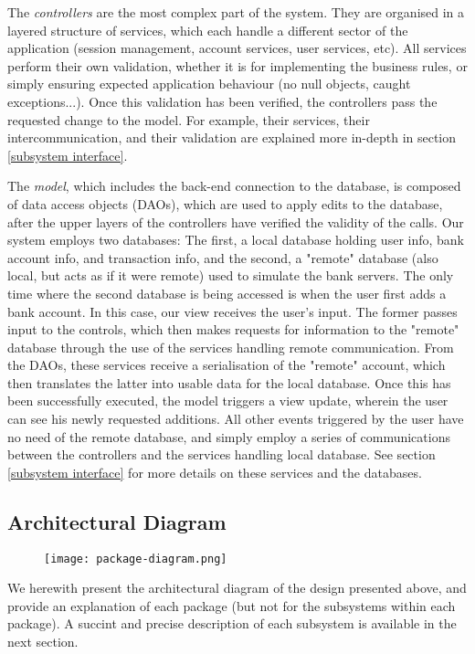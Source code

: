 \documentclass[12pt]{article}
\begin{document}
The \textit{controllers} are the most complex part of the system. They are organised in a layered structure of services, which each handle a different sector of the application (session management, account services, user services, etc). All services perform their own validation, whether it is for implementing the business rules, or simply ensuring expected application behaviour (no null objects, caught exceptions...). Once this validation has been verified, the controllers pass the requested change to the model. For example, their services, their intercommunication, and their validation are explained more in-depth in section \ref{subsystem interface}.

The \textit{model}, which includes the back-end connection to the database, is composed of data access objects (DAOs), which are used to apply edits to the database, after the upper layers of the controllers have verified the validity of the calls. Our system employs two databases: The first, a local database holding user info, bank account info, and transaction info, and the second, a "remote" database (also local, but acts as if it were remote) used to simulate the bank servers. The only time where the second database is being accessed is when the user first adds a bank account. In this case, our view receives the user's input. The former passes input to the controls, which then makes requests for information to the "remote" database through the use of the services handling remote communication. From the DAOs, these services receive a serialisation of the "remote" account, which then translates the latter into usable data for the local database. Once this has been successfully executed, the model triggers a view update, wherein the user can see his newly requested additions. All other events triggered by the user have no need of the remote database, and simply employ a series of communications between the controllers and the services handling local database. See section \ref{subsystem interface} for more details on these services and the databases.

\subsection{Architectural Diagram}

\begin{figure}[H]
\texttt{[image: package-diagram.png]}
\end{figure}

We herewith present the architectural diagram of the design presented above, and provide an explanation of each package (but not for the subsystems within each package). A succint and precise description of each subsystem is available in the next section.
\end{document}
